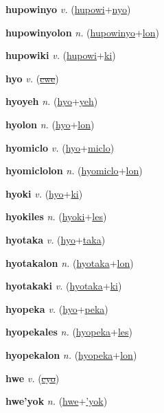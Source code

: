 \textbf{\hypertarget{hupowinyo}{hupowinyo}} \textit{v.} (\hyperlink{hupowi}{hupowi}+\allowbreak \hyperlink{nyo}{nyo})


\textbf{\hypertarget{hupowinyolon}{hupowinyolon}} \textit{n.} (\hyperlink{hupowinyo}{hupowinyo}+\allowbreak \hyperlink{lon}{lon})


\textbf{\hypertarget{hupowiki}{hupowiki}} \textit{v.} (\hyperlink{hupowi}{hupowi}+\allowbreak \hyperlink{ki}{ki})


\textbf{\hypertarget{hyo}{hyo}} \textit{v.} (\hyperlink{cwe}{\sout{cwe}})


\textbf{\hypertarget{hyoyeh}{hyoyeh}} \textit{n.} (\hyperlink{hyo}{hyo}+\allowbreak \hyperlink{yeh}{yeh})


\textbf{\hypertarget{hyolon}{hyolon}} \textit{n.} (\hyperlink{hyo}{hyo}+\allowbreak \hyperlink{lon}{lon})


\textbf{\hypertarget{hyomiclo}{hyomiclo}} \textit{v.} (\hyperlink{hyo}{hyo}+\allowbreak \hyperlink{miclo}{miclo})


\textbf{\hypertarget{hyomiclolon}{hyomiclolon}} \textit{n.} (\hyperlink{hyomiclo}{hyomiclo}+\allowbreak \hyperlink{lon}{lon})


\textbf{\hypertarget{hyoki}{hyoki}} \textit{v.} (\hyperlink{hyo}{hyo}+\allowbreak \hyperlink{ki}{ki})


\textbf{\hypertarget{hyokiles}{hyokiles}} \textit{n.} (\hyperlink{hyoki}{hyoki}+\allowbreak \hyperlink{les}{les})


\textbf{\hypertarget{hyotaka}{hyotaka}} \textit{v.} (\hyperlink{hyo}{hyo}+\allowbreak \hyperlink{taka}{taka})


\textbf{\hypertarget{hyotakalon}{hyotakalon}} \textit{n.} (\hyperlink{hyotaka}{hyotaka}+\allowbreak \hyperlink{lon}{lon})


\textbf{\hypertarget{hyotakaki}{hyotakaki}} \textit{v.} (\hyperlink{hyotaka}{hyotaka}+\allowbreak \hyperlink{ki}{ki})


\textbf{\hypertarget{hyopeka}{hyopeka}} \textit{v.} (\hyperlink{hyo}{hyo}+\allowbreak \hyperlink{peka}{peka})


\textbf{\hypertarget{hyopekales}{hyopekales}} \textit{n.} (\hyperlink{hyopeka}{hyopeka}+\allowbreak \hyperlink{les}{les})


\textbf{\hypertarget{hyopekalon}{hyopekalon}} \textit{n.} (\hyperlink{hyopeka}{hyopeka}+\allowbreak \hyperlink{lon}{lon})


\textbf{\hypertarget{hwe}{hwe}} \textit{v.} (\hyperlink{cyo}{\sout{cyo}})


\textbf{\hypertarget{hwe'yok}{hwe'yok}} \textit{n.} (\hyperlink{hwe}{hwe}+\allowbreak \hyperlink{'yok}{'yok})


